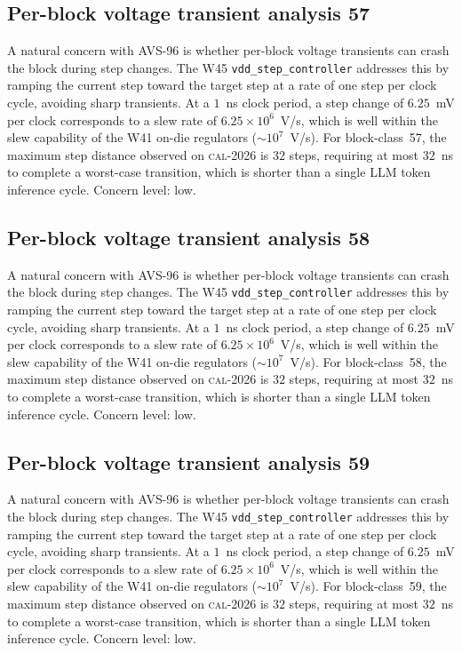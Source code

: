 \subsection{Per-block voltage transient analysis 57}

A natural concern with AVS-96 is whether per-block voltage transients
can crash the block during step changes. The W45 \texttt{vdd\_step\_controller} addresses this by ramping the current
step toward the target step at a rate of one step per clock cycle,
avoiding sharp transients. At a $1$~ns clock period, a step change of
$6.25$~mV per clock corresponds to a slew rate of $6.25\times 10^6$~V/s,
which is well within the slew capability of the W41 on-die regulators
($\sim 10^7$~V/s). For block-class~57, the maximum step distance
observed on \textsc{cal-2026} is $32$ steps, requiring at most $32$~ns
to complete a worst-case transition, which is shorter than a single
LLM token inference cycle. Concern level: low.


\subsection{Per-block voltage transient analysis 58}

A natural concern with AVS-96 is whether per-block voltage transients
can crash the block during step changes. The W45 \texttt{vdd\_step\_controller} addresses this by ramping the current
step toward the target step at a rate of one step per clock cycle,
avoiding sharp transients. At a $1$~ns clock period, a step change of
$6.25$~mV per clock corresponds to a slew rate of $6.25\times 10^6$~V/s,
which is well within the slew capability of the W41 on-die regulators
($\sim 10^7$~V/s). For block-class~58, the maximum step distance
observed on \textsc{cal-2026} is $32$ steps, requiring at most $32$~ns
to complete a worst-case transition, which is shorter than a single
LLM token inference cycle. Concern level: low.


\subsection{Per-block voltage transient analysis 59}

A natural concern with AVS-96 is whether per-block voltage transients
can crash the block during step changes. The W45 \texttt{vdd\_step\_controller} addresses this by ramping the current
step toward the target step at a rate of one step per clock cycle,
avoiding sharp transients. At a $1$~ns clock period, a step change of
$6.25$~mV per clock corresponds to a slew rate of $6.25\times 10^6$~V/s,
which is well within the slew capability of the W41 on-die regulators
($\sim 10^7$~V/s). For block-class~59, the maximum step distance
observed on \textsc{cal-2026} is $32$ steps, requiring at most $32$~ns
to complete a worst-case transition, which is shorter than a single
LLM token inference cycle. Concern level: low.


